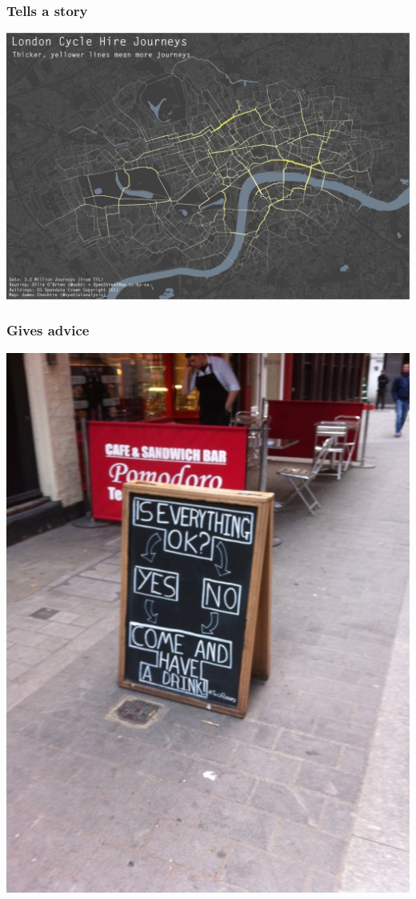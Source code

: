 \documentclass{beamer}
\begin{document}
\begin{frame}
  \frametitle{Tells a story}
  \begin{center}
    \includegraphics[width = \textwidth, keepaspectratio = true]{figure/bike_ggplot}
  \end{center}
\end{frame}

\begin{frame}
  \frametitle{Gives advice}
  \begin{center}
    \includegraphics[height = 0.8\textheight, keepaspectratio = true]{figure/pub_flow}
  \end{center}
\end{frame}
\end{document}
